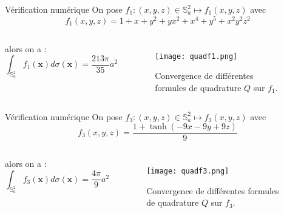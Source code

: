 \documentclass[11pt]{beamer}
\def\gint{\displaystyle\int}
\begin{document}
\begin{frame}{Vérification numérique}
On pose $f_1 : (x,y,z) \in \mathbb{S}_a^2 \mapsto
f_1(x,y,z)$ avec
$$
f_1(x,y,z) = 1+x+y^2 + yx^2 + x^4 + y^5 + x^2 y^2 z^2
$$
\begin{columns}
alors on a :
$$
\gint_{\mathbb{S}_a^2}f_1(\mathbf{x}) d \sigma(\mathbf{x}) = \dfrac{213 \pi}{35} a^2
$$

\begin{figure}
\begin{center}
\texttt{[image: quadf1.png]}
\caption{Convergence de différentes formules de quadrature $Q$ sur $f_1$.}
\end{center}
\end{figure}
\end{columns}
\end{frame}












\begin{frame}{Vérification numérique}
On pose $f_3 : (x,y,z) \in \mathbb{S}_a^2 \mapsto
f_3(x,y,z)$ avec
$$
f_3(x,y,z) = \frac{1 + \tanh(-9x-9y+9z)}{9}
$$
\begin{columns}
alors on a :
$$
\gint_{\mathbb{S}_a^2}f_3(\mathbf{x}) d \sigma(\mathbf{x}) = \dfrac{4 \pi}{9} a^2
$$

\begin{figure}
\begin{center}
\texttt{[image: quadf3.png]}
\caption{Convergence de différentes formules de quadrature $Q$ sur $f_3$.}
\end{center}
\end{figure}
\end{columns}
\end{frame}




\end{document}
